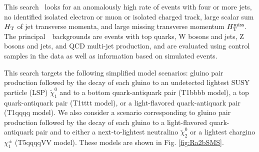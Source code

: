
This search~\cite{Khachatryan:2016kdk} looks for an anomalously high rate of events
with four or more jets,
no identified isolated electron or muon
or isolated charged track,
large scalar sum $H_{\rm T}$ of jet transverse momenta,
and large missing transverse momentum $H_{\text{T}}^{\rm miss}$.
The principal~\sm~backgrounds are
 events with top quarks,
W bosons and jets,
Z bosons and jets,
and QCD multi-jet production,
and are evaluated using control samples in the data as well 
as information based on simulated events.

This search targets the following simplified model scenarios:
gluino pair production
followed by the decay of each gluino to an undetected
lightest SUSY particle (LSP) $\tilde{\chi}^{0}_{1}$
and to a bottom quark-antiquark pair (T1bbbb model),
a top quark-antiquark pair (T1tttt model),
or a light-flavored quark-antiquark pair (T1qqqq model).
We also consider a scenario corresponding to gluino pair
production followed by the decay of each gluino to
a light-flavored quark-antiquark pair and to either
a next-to-lightest neutralino $\tilde{\chi}^{0}_{2}$
or a lightest chargino $\chi^{\pm}_{1}$ (T5qqqqVV model). These models are shown in 
Fig. \ref{fig:Ra2bSMS}.

